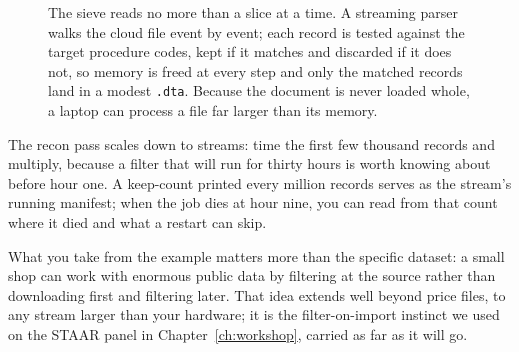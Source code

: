 \begin{figure}[htbp]
\centering
{}
\caption[The streaming sieve]{The sieve reads no more than a slice at a time.
A streaming parser walks the cloud file event by event; each record is
tested against the target procedure codes, kept if it matches and
discarded if it does not, so memory is freed at every step and only the
matched records land in a modest \texttt{.dta}. Because the document is
never loaded whole, a laptop can process a file far larger than its
memory.}
\label{fig:ch04-viz-sieve}
\end{figure}

The recon pass scales down to streams: time the first few thousand records and multiply, because a filter that will run for thirty hours is worth knowing about before hour one. A keep-count printed every million records serves as the stream's running manifest; when the job dies at hour nine, you can read from that count where it died and what a restart can skip.

What you take from the example matters more than the specific dataset: a small shop can work with enormous public data by filtering at the source rather than downloading first and filtering later. That idea extends well beyond price files, to any stream larger than your hardware; it is the filter-on-import instinct we used on the STAAR panel in Chapter~\ref{ch:workshop}, carried as far as it will go.

